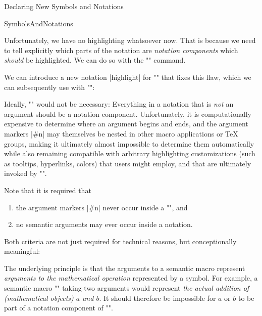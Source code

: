 \begin{sfragment}{Declaring New Symbols and Notations}
\begin{smodule}[ns=https://github.com/slatex/sTeX/doc]{SymbolsAndNotations}
    \begin{function}{\comp}
        Unfortunately, we have no highlighting whatsoever now.
        That is because we need to tell \sTeX explicitly which parts
        of the notation are \emph{notation components} which \emph{should}
        be highlighted.
        We can do so with the \stexcode"\comp" command.
    \end{function}

    We can introduce a new notation |highlight| for 
    \stexcode"\binarysymbol" that fixes this flaw, which we can
    subsequently use with \stexcode"\binarysymbol[highlight]":


    \begin{dangerbox}
        Ideally, \stexcode"\comp" would not be necessary: Everything
        in a notation that is \emph{not} an argument should be a notation
        component. Unfortunately, it is computationally expensive
        to determine where an argument begins and ends, and
        the argument markers |#n| may themselves be nested in other macro applications
        or \TeX\xspace groups,
        making it ultimately almost impossible to determine them automatically
        while also remaining compatible with arbitrary highlighting customizations
        (such as tooltips, hyperlinks, colors) that users might employ, and
        that are ultimately invoked by \stexcode"\comp".
    \end{dangerbox}
    \begin{dangerbox}
        Note that it is required that 
        \begin{enumerate}
            \item the argument markers |#n| never occur inside a \stexcode"\comp", and
            \item no semantic arguments may ever occur inside a notation.
        \end{enumerate}
        Both criteria are not just required for technical reasons,
        but conceptionally meaningful: 
        
        The underlying principle
        is that the arguments to a semantic macro represent
        \emph{arguments to the mathematical operation}
        represented by a symbol. For example, a semantic macro
        \stexcode"" taking two arguments would represent
        \emph{the actual addition of (mathematical objects) $a$ and $b$}.
        It should therefore be impossible for $a$ or $b$ to be part
        of a notation component of \stexcode"\addition".


\end{dangerbox}
\end{smodule}
\end{sfragment}
